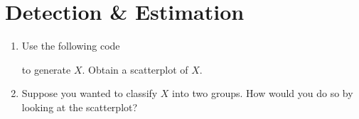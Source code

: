 \documentclass[journal,12pt,twocolumn]{IEEEtran}
\renewcommand\thesection{\arabic{section}}
\begin{document}
\section{Detection \& Estimation}
\begin{enumerate}[label=\thesection.\arabic*
,ref=\thesection.\theenumi]
%
%

%
\item Use the following code 

%
to generate $X$. Obtain a scatterplot of $X$.
%
\item Suppose you wanted to classify  $X$ into two groups.  How would you do so by looking at the scatterplot?
%
%
%
%
%
%

\end{enumerate}
\end{document}
